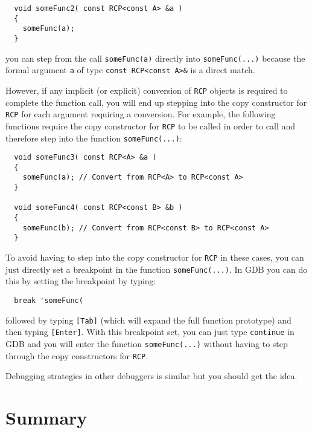 \documentclass[pdf,ps2pdf,11pt]{SANDreport}
\begin{document}
{\small\begin{verbatim}
  void someFunc2( const RCP<const A> &a )
  {
    someFunc(a);
  }
\end{verbatim}}

{}\noindent{}you can step from the call {}\texttt{someFunc(a)}
directly into {}\texttt{someFunc(...)} because the formal argument
{}\texttt{a} of type {}\texttt{const RCP<const A>\&} is a direct
match.

However, if any implicit (or explicit) conversion of {}\texttt{RCP}
objects is required to complete the function call, you will end up
stepping into the copy constructor for {}\texttt{RCP} for each
argument requiring a conversion.  For example, the following functions
require the copy constructor for {}\texttt{RCP} to be called in order
to call and therefore step into the function {}\texttt{someFunc(...)}:

{\small\begin{verbatim}
  void someFunc3( const RCP<A> &a )
  {
    someFunc(a); // Convert from RCP<A> to RCP<const A>
  }

  void someFunc4( const RCP<const B> &b )
  {
    someFunc(b); // Convert from RCP<const B> to RCP<const A>
  }
\end{verbatim}}

To avoid having to step into the copy constructor for {}\texttt{RCP}
in these cases, you can just directly set a breakpoint in the function
{}\texttt{someFunc(...)}.  In GDB you can do this by setting the
breakpoint by typing:

{\small\begin{verbatim}
  break 'someFunc(
\end{verbatim}}

{}\noindent{}followed by typing {}\texttt{[Tab]} (which will expand
the full function prototype) and then typing {}\texttt{[Enter]}.  With
this breakpoint set, you can just type {}\texttt{continue} in GDB and
you will enter the function {}\texttt{someFunc(...)} without having to
step through the copy constructors for {}\texttt{RCP}.

Debugging strategies in other debuggers is similar but you should get
the idea.


%
\section{Summary}
%
\end{document}
